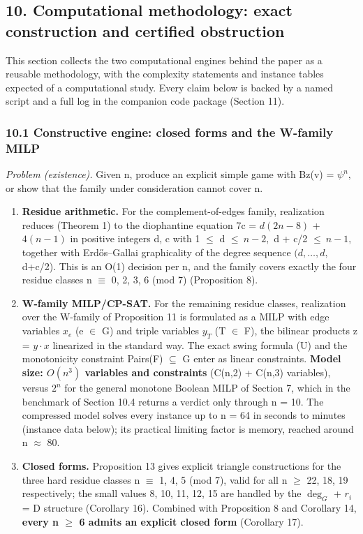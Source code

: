 \documentclass[
]{article}
\providecommand{\tightlist}{%
  \setlength{\itemsep}{0pt}\setlength{\parskip}{0pt}}
\begin{document}
\subsection{10. Computational methodology: exact construction and
certified
obstruction}\label{computational-methodology-exact-construction-and-certified-obstruction}

This section collects the two computational engines behind the paper as
a reusable methodology, with the complexity statements and instance
tables expected of a computational study. Every claim below is backed by
a named script and a full log in the companion code package (Section
11).

\subsubsection{10.1 Constructive engine: closed forms and the W-family
MILP}\label{constructive-engine-closed-forms-and-the-w-family-milp}

\emph{Problem (existence).} Given n, produce an explicit simple game
with Bz(v) = \(\psi^n,\) or show that the family under consideration
cannot cover n.

\begin{enumerate}
\def\labelenumi{\arabic{enumi}.}
\tightlist
\item
  \textbf{Residue arithmetic.} For the complement-of-edges family,
  realization reduces (Theorem 1) to the diophantine equation 7c =
  \(d(2n-8)\) + \(4(n-1)\) in positive integers d, c with 1 \(\le\) d
  \(\le\ n-2,\) d + c/2 \(\le\ n-1,\) together with Erdős--Gallai
  graphicality of the degree sequence \((d,\dots,d,\) d+c/2). This is an
  O(1) decision per n, and the family covers exactly the four residue
  classes n \(\equiv\) 0, 2, 3, 6 (mod 7) (Proposition 8).
\item
  \textbf{W-family MILP/CP-SAT.} For the remaining residue classes,
  realization over the W-family of Proposition 11 is formulated as a
  MILP with edge variables \(x_e\) (e \(\in\) G) and triple variables
  \(y_T\) (T \(\in\) F), the bilinear products z = \(y\cdot x\)
  linearized in the standard way. The exact swing formula (U) and the
  monotonicity constraint Pairs(F) \(\subseteq\) G enter as linear
  constraints. \textbf{Model size: \(O(n^3)\) variables and constraints}
  (C(n,2) + C(n,3) variables), versus \(2^n\) for the general monotone
  Boolean MILP of Section 7, which in the benchmark of Section 10.4
  returns a verdict only through n = 10. The compressed model solves
  every instance up to n = 64 in seconds to minutes (instance data
  below); its practical limiting factor is memory, reached around n
  \(\approx\) 80.
\item
  \textbf{Closed forms.} Proposition 13 gives explicit triangle
  constructions for the three hard residue classes n \(\equiv\) 1, 4, 5
  (mod 7), valid for all n \(\ge\) 22, 18, 19 respectively; the small
  values 8, 10, 11, 12, 15 are handled by the \(\deg_G\) + \(r_i\) = D
  structure (Corollary 16). Combined with Proposition 8 and Corollary
  14, \textbf{every n \(\ge\) 6 admits an explicit closed form}
  (Corollary 17).
\end{enumerate}
\end{document}
